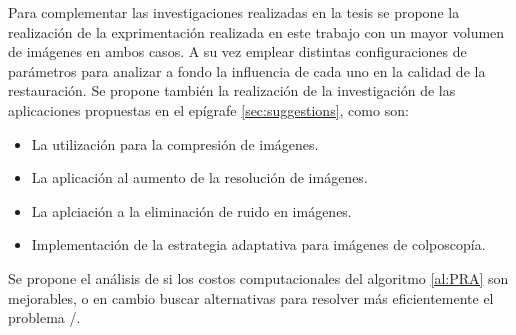 \begin{recomendations}\label{chapter:Recomendations}

Para complementar las investigaciones realizadas en la tesis se propone la realizaci\'on de la exprimentaci\'on realizada en este trabajo con un mayor volumen de im\'agenes en ambos casos. A su vez emplear distintas configuraciones de par\'ametros para analizar a fondo la influencia de cada uno en la calidad de la restauraci\'on. Se propone tambi\'en la realizaci\'on de la investigaci\'on de las aplicaciones propuestas en el epígrafe \ref{sec:suggestions}, como son:
\begin{itemize}
	\item La utilizaci\'on para la compresi\'on de im\'agenes.
	\item La aplicaci\'on al aumento de la resoluci\'on de im\'agenes.
	\item La aplciaci\'on a la eliminaci\'on de ruido en im\'agenes.
	\item Implementaci\'on de la estrategia adaptativa para im\'agenes de colposcop\'ia.
\end{itemize}
Se propone el an\'alisis de si los costos computacionales del algoritmo \ref{al:PRA} son mejorables, o en cambio buscar alternativas para resolver m\'as eficientemente el problema \TSP/. 


\end{recomendations}
